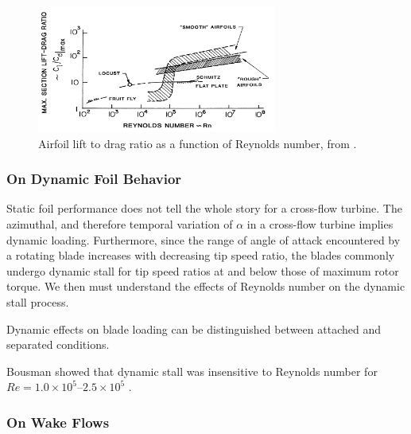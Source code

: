 \documentclass[energies,article,accept,moreauthors,pdftex,12pt,a4paper]{mdpi}
\begin{document}

\begin{figure}[ht]
\centering
\includegraphics[width=0.7\textwidth]{figures/McMasters-Henderson-1980}
\caption{Airfoil lift to drag ratio as a function of Reynolds number, from 
\cite{McMasters1980}.}
\label{fig:McMasters}
\end{figure}

\subsubsection{On Dynamic Foil Behavior}

Static foil performance does not tell the whole story for a cross-flow turbine.
The azimuthal, and therefore temporal variation of $\alpha$ in a cross-flow
turbine implies dynamic loading. Furthermore, since the range of angle of 
attack encountered by a rotating blade increases with decreasing tip speed 
ratio, the blades commonly undergo
dynamic stall for tip speed ratios at and below those of maximum rotor
torque\cite{Para2002}. We then must understand the effects of Reynolds number on
the dynamic stall process.

Dynamic effects on blade loading can be distinguished between attached and
separated conditions. 


Bousman showed that dynamic stall was insensitive to Reynolds number for $Re=1.0
\times 10^5$--$2.5 \times 10^5$ \cite{Bousman2000-evaluation}.


\subsubsection{On Wake Flows}
\end{document}
